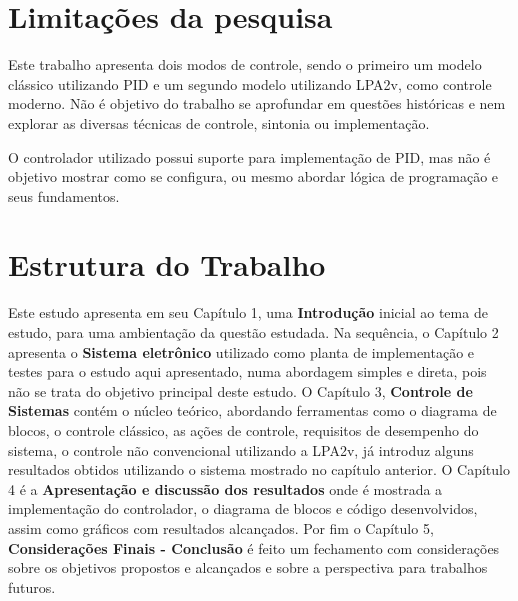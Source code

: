 \section{Limitações da pesquisa}


Este trabalho apresenta dois modos de controle, 
sendo o primeiro um modelo clássico utilizando PID e 
um segundo modelo utilizando LPA2v, 
como controle moderno. 
Não é objetivo do trabalho se aprofundar em questões históricas e 
nem explorar as diversas técnicas de controle, 
sintonia ou implementação.

O controlador utilizado possui 
suporte para implementação de PID, 
mas não é objetivo mostrar como se configura, 
ou mesmo abordar lógica de programação e seus fundamentos.



\section{Estrutura do Trabalho}

Este estudo apresenta em seu Capítulo 1, 
uma \textbf{Introdução} inicial ao tema de estudo, 
para uma ambientação da questão estudada. 
Na sequência, o Capítulo 2 apresenta o 
\textbf{Sistema eletrônico} 
utilizado como planta de implementação e 
testes para o estudo aqui apresentado, 
numa abordagem simples e direta, 
pois não se trata do objetivo principal deste estudo. 
O Capítulo 3, 
\textbf{Controle de Sistemas} contém o núcleo teórico, 
abordando ferramentas como o diagrama de blocos, 
o controle clássico, 
as ações de controle, 
requisitos de desempenho do sistema,
o controle não convencional utilizando a LPA2v,
já introduz alguns resultados 
obtidos utilizando o sistema mostrado no capítulo anterior. 
O Capítulo 4 é a 
\textbf{Apresentação e discussão dos resultados} 
onde é mostrada a implementação do controlador, 
o diagrama de blocos e código desenvolvidos, 
assim como gráficos com resultados alcançados.
Por fim o Capítulo 5, 
\textbf{Considerações Finais - Conclusão} 
é feito um fechamento com considerações sobre os objetivos propostos e alcançados e sobre a perspectiva para trabalhos futuros.


